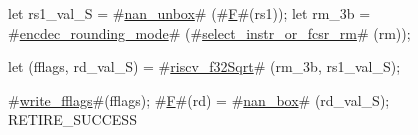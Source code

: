 let rs1_val_S = #\hyperref[sailRISCVznanzyunbox]{nan\_unbox}# (#\hyperref[sailRISCVzF]{F}#(rs1));
let rm_3b     = #\hyperref[sailRISCVzencdeczyroundingzymode]{encdec\_rounding\_mode}# (#\hyperref[sailRISCVzselectzyinstrzyorzyfcsrzyrm]{select\_instr\_or\_fcsr\_rm}#  (rm));

let (fflags, rd_val_S) = #\hyperref[sailRISCVzriscvzyf32Sqrt]{riscv\_f32Sqrt}#   (rm_3b, rs1_val_S);

#\hyperref[sailRISCVzwritezyfflags]{write\_fflags}#(fflags);
#\hyperref[sailRISCVzF]{F}#(rd) = #\hyperref[sailRISCVznanzybox]{nan\_box}# (rd_val_S);
RETIRE_SUCCESS

